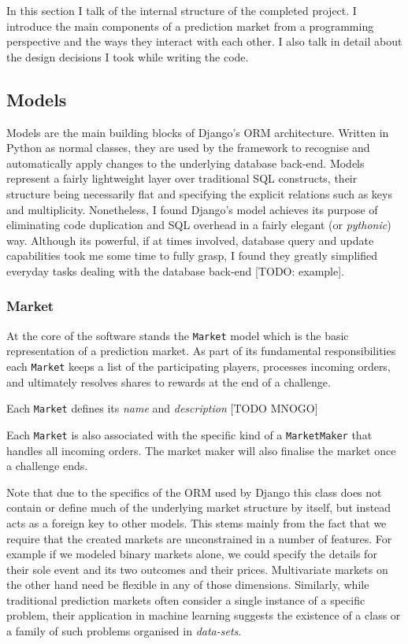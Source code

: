 \documentclass[bsc,frontabs,twoside,singlespacing,parskip,deptreport]{infthesis}     %
\begin{document}
In this section I talk of the internal structure of the completed project. I introduce the main components of a prediction market from a programming perspective and the ways they interact with each other. I also talk in detail about the design decisions I took while writing the code.

\subsection{Models}
    Models are the main building blocks of Django's ORM architecture. Written in Python as normal classes, they are used by the framework to recognise and automatically apply changes to the underlying database back-end. Models represent a fairly lightweight layer over traditional SQL constructs, their structure being necessarily flat and specifying the explicit relations such as keys and multiplicity. Nonetheless, I found Django’s model achieves its purpose of eliminating code duplication and SQL overhead in a fairly elegant (or {\em pythonic}) way. Although its powerful, if at times involved, database query and update capabilities took me some time to fully grasp, I found they greatly simplified everyday tasks dealing with the database back-end [TODO: example]. 

\subsubsection{Market}

    At the core of the software stands the {\tt Market} model which is the basic representation of a prediction market. As part of its fundamental responsibilities each {\tt Market} keeps a list of the participating players, processes incoming orders, and ultimately resolves shares to rewards at the end of a challenge.  

	Each {\tt Market} defines its {\em name} and {\em description} [TODO MNOGO]
    
	Each {\tt Market} is also associated with the specific kind of a {\tt MarketMaker} that handles all incoming orders. The market maker will also finalise the market once a challenge ends.

	Note that due to the specifics of the ORM used by Django this class does not contain or define much of the underlying market structure by itself, but instead acts as a foreign key to other models. This stems mainly from the fact that we require that the created markets are unconstrained in a number of features. For example if we modeled binary markets alone, we could specify the details for their sole event and its two outcomes and their prices. Multivariate markets on the other hand need be flexible in any of those dimensions. Similarly, while traditional prediction markets often consider a single instance of a specific problem, their application in machine learning suggests the existence of a class or a family of such problems organised in {\em data-sets}. 
	
\end{document}
